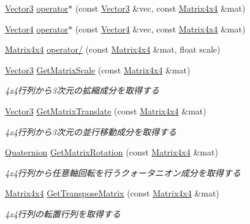 \begin{DoxyCompactItemize}
\mbox{\hyperlink{struct_math_1_1_vector3}{Vector3}} \mbox{\hyperlink{namespace_math_aa7973248d0183ea280fef5097eb6ef3f}{operator$\ast$}} (const \mbox{\hyperlink{struct_math_1_1_vector3}{Vector3}} \&vec, const \mbox{\hyperlink{struct_math_1_1_matrix4x4}{Matrix4x4}} \&mat)
\item 
\mbox{\hyperlink{struct_math_1_1_vector4}{Vector4}} \mbox{\hyperlink{namespace_math_a4d7db6c4bdacba08e4a5488fe9643450}{operator$\ast$}} (const \mbox{\hyperlink{struct_math_1_1_vector4}{Vector4}} \&vec, const \mbox{\hyperlink{struct_math_1_1_matrix4x4}{Matrix4x4}} \&mat)
\item 
\mbox{\hyperlink{struct_math_1_1_matrix4x4}{Matrix4x4}} \mbox{\hyperlink{namespace_math_a283dc37f79d3f2d51bb3e494f02a0ad3}{operator/}} (const \mbox{\hyperlink{struct_math_1_1_matrix4x4}{Matrix4x4}} \&mat, float scale)
\item 
\mbox{\hyperlink{struct_math_1_1_vector3}{Vector3}} \mbox{\hyperlink{namespace_math_af3d07a84dd7006820b10c0dcca8d649d}{Get\+Matrix\+Scale}} (const \mbox{\hyperlink{struct_math_1_1_matrix4x4}{Matrix4x4}} \&mat)
\begin{DoxyCompactList}\small\item\em 4x4行列から3次元の拡縮成分を取得する \end{DoxyCompactList}\item 
\mbox{\hyperlink{struct_math_1_1_vector3}{Vector3}} \mbox{\hyperlink{namespace_math_a362448daab24abbbe2f8aeb947396e45}{Get\+Matrix\+Translate}} (const \mbox{\hyperlink{struct_math_1_1_matrix4x4}{Matrix4x4}} \&mat)
\begin{DoxyCompactList}\small\item\em 4x4行列から3次元の並行移動成分を取得する \end{DoxyCompactList}\item 
\mbox{\hyperlink{struct_math_1_1_quaternion}{Quaternion}} \mbox{\hyperlink{namespace_math_af020b3d35d199e53d32895a737e7c02e}{Get\+Matrix\+Rotation}} (const \mbox{\hyperlink{struct_math_1_1_matrix4x4}{Matrix4x4}} \&mat)
\begin{DoxyCompactList}\small\item\em 4x4行列から任意軸回転を行うクォータニオン成分を取得する \end{DoxyCompactList}\item 
\mbox{\hyperlink{struct_math_1_1_matrix4x4}{Matrix4x4}} \mbox{\hyperlink{namespace_math_a4cc0372b98a0dd4833848ee1bf268332}{Get\+Transpose\+Matrix}} (const \mbox{\hyperlink{struct_math_1_1_matrix4x4}{Matrix4x4}} \&mat)
\begin{DoxyCompactList}\small\item\em 4x4行列の転置行列を取得する \end{DoxyCompactList}\item 

\end{DoxyCompactItemize}
